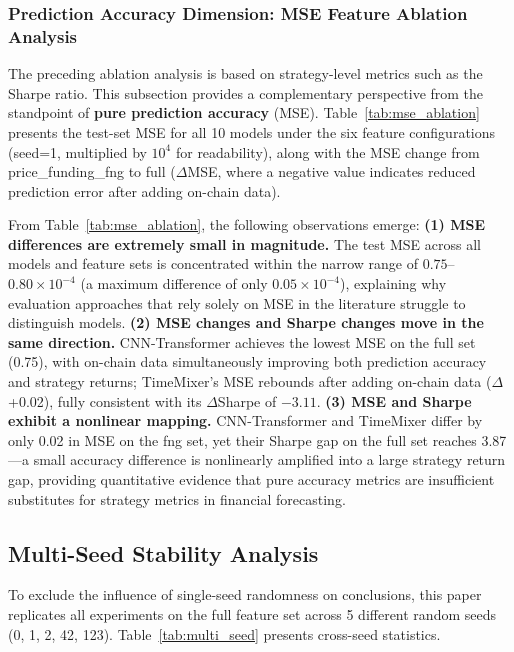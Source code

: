 \documentclass[a4paper]{cas-dc}
\begin{document}
\subsubsection{Prediction Accuracy Dimension: MSE Feature Ablation Analysis}

The preceding ablation analysis is based on strategy-level metrics such as the Sharpe ratio. This subsection provides a complementary perspective from the standpoint of \textbf{pure prediction accuracy} (MSE). Table~\ref{tab:mse_ablation} presents the test-set MSE for all 10 models under the six feature configurations (seed=1, multiplied by $10^{4}$ for readability), along with the MSE change from price\_funding\_fng to full ($\Delta$MSE, where a negative value indicates reduced prediction error after adding on-chain data).



From Table~\ref{tab:mse_ablation}, the following observations emerge: \textbf{(1) MSE differences are extremely small in magnitude.} The test MSE across all models and feature sets is concentrated within the narrow range of $0.75$--$0.80\times10^{-4}$ (a maximum difference of only $0.05\times10^{-4}$), explaining why evaluation approaches that rely solely on MSE in the literature struggle to distinguish models. \textbf{(2) MSE changes and Sharpe changes move in the same direction.} CNN-Transformer achieves the lowest MSE on the full set (0.75), with on-chain data simultaneously improving both prediction accuracy and strategy returns; TimeMixer's MSE rebounds after adding on-chain data ($\Delta$+0.02), fully consistent with its $\Delta$Sharpe of $-3.11$. \textbf{(3) MSE and Sharpe exhibit a nonlinear mapping.} CNN-Transformer and TimeMixer differ by only 0.02 in MSE on the fng set, yet their Sharpe gap on the full set reaches 3.87---a small accuracy difference is nonlinearly amplified into a large strategy return gap, providing quantitative evidence that pure accuracy metrics are insufficient substitutes for strategy metrics in financial forecasting.

\subsection{Multi-Seed Stability Analysis}

To exclude the influence of single-seed randomness on conclusions, this paper replicates all experiments on the full feature set across 5 different random seeds (0, 1, 2, 42, 123). Table~\ref{tab:multi_seed} presents cross-seed statistics.
\end{document}
